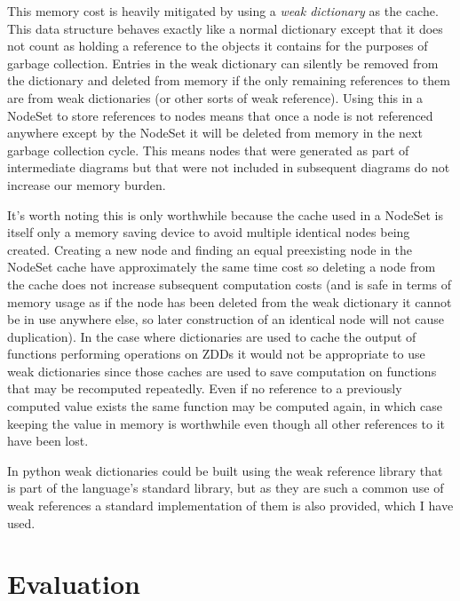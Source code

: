 \documentclass[12pt,a4paper,twoside,openright]{report}
\begin{document}
This memory cost is heavily mitigated by using a \textit{weak dictionary} as the cache. This data structure behaves exactly like a normal dictionary except that it does not count as holding a reference to the objects it contains for the purposes of garbage collection. Entries in the weak dictionary can silently be removed from the dictionary and deleted from memory if the only remaining references to them are from weak dictionaries (or other sorts of weak reference). Using this in a NodeSet to store references to nodes means that once a node is not referenced anywhere except by the NodeSet it will be deleted from memory in the next garbage collection cycle. This means nodes that were generated as part of intermediate diagrams but that were not included in subsequent diagrams do not increase our memory burden.

It's worth noting this is only worthwhile because the cache used in a NodeSet is itself only a memory saving device to avoid multiple identical nodes being created. Creating a new node and finding an equal preexisting node in the NodeSet cache have approximately the same time cost so deleting a node from the cache does not increase subsequent computation costs (and is safe in terms of memory usage as if the node has been deleted from the weak dictionary it cannot be in use anywhere else, so later construction of an identical node will not cause duplication). In the case where dictionaries are used to cache the output of functions performing operations on ZDDs it would not be appropriate to use weak dictionaries since those caches are used to save computation on functions that may be recomputed repeatedly. Even if no reference to a previously computed value exists the same function may be computed again, in which case keeping the value in memory is worthwhile even though all other references to it have been lost.

In python weak dictionaries could be built using the weak reference library that is part of the language's standard library, but as they are such a common use of weak references a standard implementation of them is also provided, which I have used.


\chapter{Evaluation}
\end{document}

